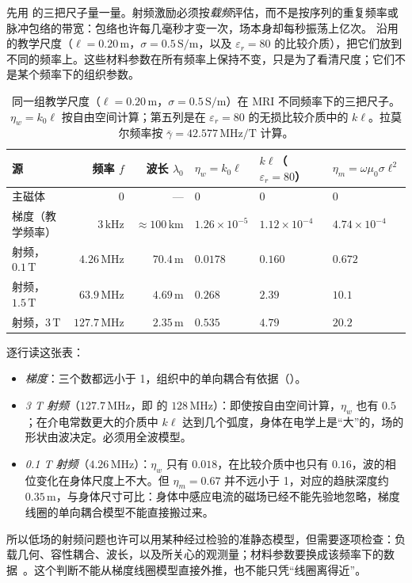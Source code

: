 先用 的三把尺子量一量。射频激励必须按\emph{载频}评估，而不是按序列的重复频率或脉冲包络的带宽：包络也许每几毫秒才变一次，场本身却每秒振荡上亿次。 沿用 的教学尺度（$\ell=0.20\,\mathrm m$，$\sigma=0.5\,\mathrm{S/m}$，以及 $\varepsilon_r=80$ 的比较介质），把它们放到不同的频率上。这些材料参数在所有频率上保持不变，只是为了看清尺度；它们不是某个频率下的组织参数。

\begin{table}[htbp]\centering\small
\caption{同一组教学尺度（$\ell=0.20\,\mathrm m$，$\sigma=0.5\,\mathrm{S/m}$）在 MRI 不同频率下的三把尺子。$\eta_w=k_0\ell$ 按自由空间计算；第五列是在 $\varepsilon_r=80$ 的无损比较介质中的 $k\ell$。拉莫尔频率按 $\bar\gamma=42.577\,\mathrm{MHz/T}$ 计算。}\label{tab:rf-ranges}
\begin{tabularx}{\linewidth}{@{}l r r Y Y Y@{}}
\toprule
源 & 频率 $f$ & 波长 $\lambda_0$ & $\eta_w=k_0\ell$ & $k\ell$（$\varepsilon_r=80$） & $\eta_m=\omega\mu_0\sigma\ell^2$\\\midrule
主磁体 & 0 & --- & 0 & 0 & 0\\
梯度（教学频率） & $3\,\mathrm{kHz}$ & $\approx100\,\mathrm{km}$ & $1.26\times10^{-5}$ & $1.12\times10^{-4}$ & $4.74\times10^{-4}$\\
射频，$0.1\,\mathrm T$ & $4.26\,\mathrm{MHz}$ & $70.4\,\mathrm m$ & $0.0178$ & $0.160$ & $0.672$\\
射频，$1.5\,\mathrm T$ & $63.9\,\mathrm{MHz}$ & $4.69\,\mathrm m$ & $0.268$ & $2.39$ & $10.1$\\
射频，$3\,\mathrm T$ & $127.7\,\mathrm{MHz}$ & $2.35\,\mathrm m$ & $0.535$ & $4.79$ & $20.2$\\
\bottomrule
\end{tabularx}
\end{table}

逐行读这张表：
\begin{itemize}
\item \emph{梯度}：三个数都远小于 1，组织中的单向耦合有依据（）。
\item \emph{3 T 射频}（$127.7\,\mathrm{MHz}$，即 的 $128\,\mathrm{MHz}$）：即使按自由空间计算，$\eta_w$ 也有 $0.5$；在介电常数更大的介质中 $k\ell$ 达到几个弧度，身体在电学上是“大”的，场的形状由波决定。必须用全波模型。
\item \emph{0.1 T 射频}（$4.26\,\mathrm{MHz}$）：$\eta_w$ 只有 $0.018$，在比较介质中也只有 $0.16$，波的相位变化在身体尺度上不大。但 $\eta_m=0.67$ 并不远小于 1，对应的趋肤深度约 $0.35\,\mathrm m$，与身体尺寸可比：身体中感应电流的磁场已经不能先验地忽略，梯度线圈的单向耦合模型不能直接搬过来。
\end{itemize}
所以低场的射频问题也许可以用某种经过检验的准静态模型，但需要逐项检查：负载几何、容性耦合、波长，以及所关心的观测量；材料参数要换成该频率下的数据~\cite{itisdielectric}。这个判断不能从梯度线圈模型直接外推，也不能只凭“线圈离得近”。

